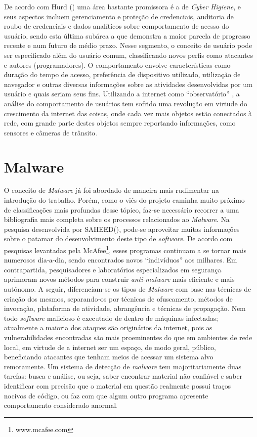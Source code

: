 De acordo com Hurd (\citeyear{hurd15}) uma área bastante promissora é a de
\emph{Cyber Higiene}, e seus aspectos incluem gerenciamento e proteção de credenciais,
auditoria de roubo de credenciais e dados analíticos sobre comportamento de
acesso do usuário, sendo esta última subárea a que demonstra a maior parcela
de progresso recente e num futuro de médio prazo. Nesse segmento, o conceito
de usuário pode ser especificado além do usuário comum, classificando novos
perfis como atacantes e autores (programadores). O comportamento envolve
características como duração do tempo de acesso, preferência de dispositivo
utilizado, utilização de navegador e outras diversas informações sobre as
atividades desenvolvidas por um usuário e quais seriam seus fins. Utilizando a
internet como ``observatório'' , a análise do comportamento de
usuários tem sofrido uma revolução em virtude do crescimento da internet das
coisas, onde cada vez mais objetos estão conectados à rede, com grande parte
destes objetos sempre reportando informações, como sensores e câmeras de
trânsito.


\section{Malware}
\label{s.malware_01}

O conceito de \textit{Malware} já foi abordado de maneira mais rudimentar na introdução
do trabalho. Porém, como o viés do projeto caminha muito próximo de
classificações mais profundas desse tópico, faz-se necessário recorrer a uma bibliografia mais
completa sobre os processos relacionados ao \textit{Malware}. Na pesquisa desenvolvida
por SAHEED(\citeyear{saeed13}), pode-se aproveitar muitas informações sobre o
patamar do desenvolvimento deste tipo de \textit{software}. De acordo com pesquisas
levantadas pela McAfee\footnote{www.mcafee.com}, esses programas continuam a se tornar mais numerosos
dia-a-dia, sendo encontrados novos ``indivíduos'' aos milhares. Em
contrapartida, pesquisadores e laboratórios especializados em segurança
aprimoram novos métodos para construir \textit{anti-malware} mais eficiente e mais
autônomo. A seguir, diferenciam-se os tipos de \textit{Malware} com base nas técnicas de
criação dos mesmos, separando-os por técnicas de ofuscamento, métodos de
invocação, plataforma de atividade, abrangência e técnicas de propagação. Nem
todo \textit{software} malicioso é executado de dentro de máquinas infectadas;
atualmente a maioria dos ataques são originários da internet, pois as
vulnerabilidades encontradas são mais proeminentes do que em ambientes de rede
local, em virtude de a internet ser um espaço, de modo geral, público,
beneficiando atacantes que tenham meios de acessar um sistema alvo
remotamente. Um sistema de detecção de \textit{malware} tem majoritariamente duas
tarefas: busca e análise, ou seja, saber encontrar material não confiável e
saber identificar com precisão que o material em questão realmente possui
traços nocivos de código, ou faz com que algum outro programa apresente
comportamento considerado anormal.

